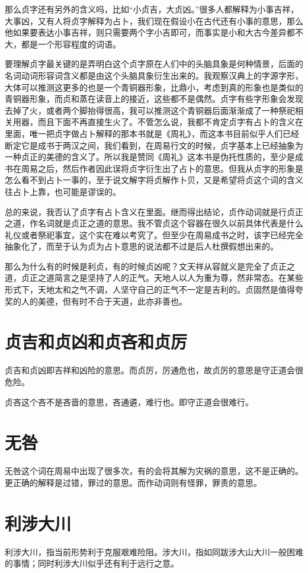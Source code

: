 \documentclass[12pt,oneside]{book}
\begin{document}
那么贞字还有另外的含义吗，比如“小贞吉，大贞凶。”很多人都解释为小事吉祥，大事凶，又有人将贞字解释为占卜，我们现在假设小在古代还有小事的意思，那么他如果要表达小事吉祥，则只需要两个字小吉即可，而事实是小和大古今差异都不大，都是一个形容程度的词语。

要理解贞字最关键的是弄明白这个贞字原在人们中的头脑具象是何种情景，后面的名词动词形容词含义都是由这个头脑具象衍生出来的。我观察汉典上的字源字形，大体可以推测这更多的也是一个青铜器形象，比鼎小，考虑到真的形象也是类似的青铜器形象，而贞和蒸在读音上的接近，这些都不是偶然。贞字有些字形象会发现去掉了火，或者两个脚抬得很高，我可以推测这个青铜器后面渐渐成了一种祭祀相关用器，而且下面不再直接生火了。不管怎么说，我都不肯定贞字有占卜的含义在里面，唯一把贞字做占卜解释的那本书就是《周礼》，而这本书目前似乎人们已经断定它是成书于两汉之间，我们看到，在周易行文的时候，贞字基本上已经抽象为一种贞正的美德的含义了。所以我是赞同《周礼》这本书是伪托性质的，至少是成书在周易之后，然后作者因此误将贞字衍生出了占卜的意思。但我从贞字的形象是怎么看不到占卜一事的，至于说文解字将贞解作卜贝，又是希望将贞这个词的含义往占卜上靠，也可能是谬误的。

总的来说，我否认了贞字有占卜含义在里面。继而得出结论，贞作动词就是行贞正之道，作名词就是贞正之道的意思。我不管贞这个容器在很久以前具体代表是什么礼仪或者祭祀事宜，这个实在难以考究了。但至少在周易成书之时，该字已经完全抽象化了，而至于认为贞为占卜意思的说法都不过是后人杜撰假想出来的。

那么为什么有的时候是利贞，有的时候贞凶呢？文天祥从容就义是完全了贞正之道，贞正之道简言之是坚持了人的正气。天地人以人为重为尊，然非常态。在某些形式下，天地太和之气不调，人坚守自己的正气不一定是吉利的。贞固然是值得夸奖的人的美德，但有时不合于天道，此亦非善也。

\section{贞吉和贞凶和贞吝和贞厉}
贞吉和贞凶即吉祥和凶险的意思。而贞厉，厉通危也，故贞厉的意思是守正道会很危险。

贞吝这个吝不是吝啬的意思，吝通遴，难行也。即守正道会很难行。

\section{无咎}
无咎这个词在周易中出现了很多次，有的会将其解为灾祸的意思，这不是正确的。更正确的解释是过错，罪过的意思。而作动词则有怪罪，罪责的意思。

\section{利涉大川}
利涉大川，指当前形势利于克服艰难险阻。涉大川，指如同跋涉大山大川一般困难的事情；同时利涉大川似乎还有利于远行之意。
\end{document}
